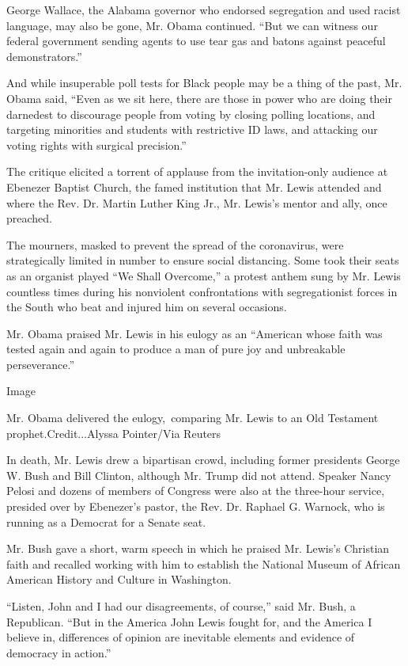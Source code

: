 George Wallace, the Alabama governor who endorsed segregation and used
racist language, may also be gone, Mr. Obama continued. ``But we can
witness our federal government sending agents to use tear gas and batons
against peaceful demonstrators.''

And while insuperable poll tests for Black people may be a thing of the
past, Mr. Obama said, ``Even as we sit here, there are those in power
who are doing their darnedest to discourage people from voting by
closing polling locations, and targeting minorities and students with
restrictive ID laws, and attacking our voting rights with surgical
precision.''

The critique elicited a torrent of applause from the invitation-only
audience at Ebenezer Baptist Church, the famed institution that Mr.
Lewis attended and where the Rev. Dr. Martin Luther King Jr., Mr.
Lewis's mentor and ally, once preached.

The mourners, masked to prevent the spread of the coronavirus, were
strategically limited in number to ensure social distancing. Some took
their seats as an organist played ``We Shall Overcome,'' a protest
anthem sung by Mr. Lewis countless times during his nonviolent
confrontations with segregationist forces in the South who beat and
injured him on several occasions.

Mr. Obama praised Mr. Lewis in his eulogy as an ``American whose faith
was tested again and again to produce a man of pure joy and unbreakable
perseverance.''

Image

Mr. Obama delivered the eulogy,~comparing Mr. Lewis to an Old Testament
prophet.Credit...Alyssa Pointer/Via Reuters

In death, Mr. Lewis drew a bipartisan crowd, including former presidents
George W. Bush and Bill Clinton, although Mr. Trump did not attend.
Speaker Nancy Pelosi and dozens of members of Congress were also at the
three-hour service, presided over by Ebenezer's pastor, the Rev. Dr.
Raphael G. Warnock, who is running as a Democrat for a Senate seat.

Mr. Bush gave a short, warm speech in which he praised Mr. Lewis's
Christian faith and recalled working with him to establish the National
Museum of African American History and Culture in Washington.

``Listen, John and I had our disagreements, of course,'' said Mr. Bush,
a Republican. ``But in the America John Lewis fought for, and the
America I believe in, differences of opinion are inevitable elements and
evidence of democracy in action.''

